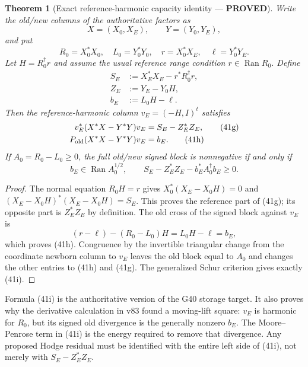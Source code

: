 \documentclass[11pt]{article}
\newtheorem{theorem}{Theorem}
\newcommand{\PROVED}{\textcolor{green!45!black}{\textbf{PROVED}}}
\newcommand{\Ran}{\operatorname{Ran}}
\begin{document}
\begin{theorem}[Exact reference-harmonic capacity identity --- \PROVED]
Write the old/new columns of the authoritative factors as
\[
 X=(X_0,X_E),\qquad Y=(Y_0,Y_E),
\]
and put
\[
 R_0=X_0^*X_0,\quad L_0=Y_0^*Y_0,\quad
 r=X_0^*X_E,\quad \ell=Y_0^*Y_E.
\]
Let $H=R_0^\dagger r$ and assume the usual reference range condition
$r\in\Ran R_0$.  Define
\begin{align}
 S_E&:=X_E^*X_E-r^*R_0^\dagger r,                     \tag{41d}\\
 Z_E&:=Y_E-Y_0H,                                      \tag{41e}\\
 b_E&:=L_0H-\ell.                                     \tag{41f}
\end{align}
Then the reference-harmonic column $v_E=(-H,I)^t$ satisfies
\begin{align}
 v_E^*(X^*X-Y^*Y)v_E&=S_E-Z_E^*Z_E,                  \tag{41g}\\
 P_{\rm old}(X^*X-Y^*Y)v_E&=b_E.                     \tag{41h}
\end{align}
If $A_0=R_0-L_0\ge0$, the full old/new signed block is nonnegative if and
only if
\begin{equation}
 b_E\in\Ran A_0^{1/2},\qquad
 \boxed{S_E-Z_E^*Z_E-b_E^*A_0^\dagger b_E\ge0.}       \tag{41i}
\end{equation}
\end{theorem}

\begin{proof}
The normal equation $R_0H=r$ gives
$X_0^*(X_E-X_0H)=0$ and
$(X_E-X_0H)^*(X_E-X_0H)=S_E$.  This proves the reference part of
(41g); its opposite part is $Z_E^*Z_E$ by definition.  The old cross of the
signed block against $v_E$ is
\[
 (r-\ell)-(R_0-L_0)H=L_0H-\ell=b_E,
\]
which proves (41h).  Congruence by the invertible triangular change from the
coordinate newborn column to $v_E$ leaves the old block equal to $A_0$ and
changes the other entries to (41h) and (41g).  The generalized Schur
criterion gives exactly (41i).
\end{proof}

Formula (41i) is the authoritative version of the G40 storage target.  It
also proves why the derivative calculation in v83 found a moving-lift square:
$v_E$ is harmonic for $R_0$, but its signed old divergence is the generally
nonzero $b_E$.  The Moore--Penrose term in (41i) is the energy required to
remove that divergence.  Any proposed Hodge residual must be identified with
the entire left side of (41i), not merely with $S_E-Z_E^*Z_E$.
\end{document}
